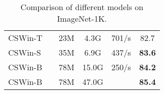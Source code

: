 \documentclass[10pt,twocolumn,letterpaper]{article}
\begin{document}
\begin{table}[t]
{{\begin{tabular}[t]{l|cccc|c}
\midrule
\rowcolor{Graylight} 
CSWin-T                              && 23M & 4.3G  & 701/s & 82.7 \\

\rowcolor{Graylight} 
CSWin-S                              && 35M & 6.9G  & 437/s & \textbf{83.6} \\
\rowcolor{Graylight} 
CSWin-B                              && 78M & 15.0G & 250/s & \textbf{84.2} \\
\rowcolor{Graylight} 
CSWin-B                              && 78M & 47.0G &     & \textbf{85.4} \\
\bottomrule
\end{tabular}}
}
\vspace{-3mm}
\caption{Comparison of different models on ImageNet-1K. } 
\vspace{-3mm}
\label{tab:imagenet}
\end{table}
\end{document}
